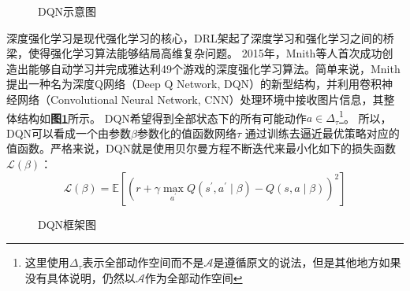 \begin{figure}[!t]
	\centering
	\caption{DQN示意图}
	\label{Fig: DQN}
\end{figure}
深度强化学习是现代强化学习的核心，DRL架起了深度学习和强化学习之间的桥梁，使得强化学习算法能够结局高维复杂问题。
2015年，Mnith等人首次成功创造出能够自动学习并完成雅达利49个游戏的深度强化学习算法。简单来说，Mnith提出一种名为深度Q网络（Deep Q Network, DQN）的新型结构，并利用卷积神经网络（Convolutional Neural Network, CNN）处理环境中接收图片信息，其整体结构如\textbf{图\ref{Fig: DQN}}所示。 DQN希望得到全部状态下的所有可能动作$a\in\Delta_{\tau}$\footnote{这里使用$\Delta_{\tau}$表示全部动作空间而不是$\mathcal{A}$是遵循原文的说法，但是其他地方如果没有具体说明，仍然以$\mathcal{A}$作为全部动作空间}。 所以，DQN可以看成一个由参数$\beta$参数化的值函数网络$\tau$
通过训练去逼近最优策略对应的值函数。严格来说，DQN就是使用贝尔曼方程不断迭代来最小化如下的损失函数$ \mathcal{L}(\beta)$：
\begin{equation}
\label{Equ: DQN loss}
    \mathcal{L}(\beta)=\mathbb{E}\left[\left(r+\gamma \max _{a^{\prime}} Q\left(s^{\prime}, a^{\prime} \mid \beta\right)-Q(s, a \mid \beta)\right)^{2}\right]
\end{equation}
\begin{figure}[!t]
	\centering
	\caption{DQN框架图}
	\label{Fig: DQN frameworks}
\end{figure}

